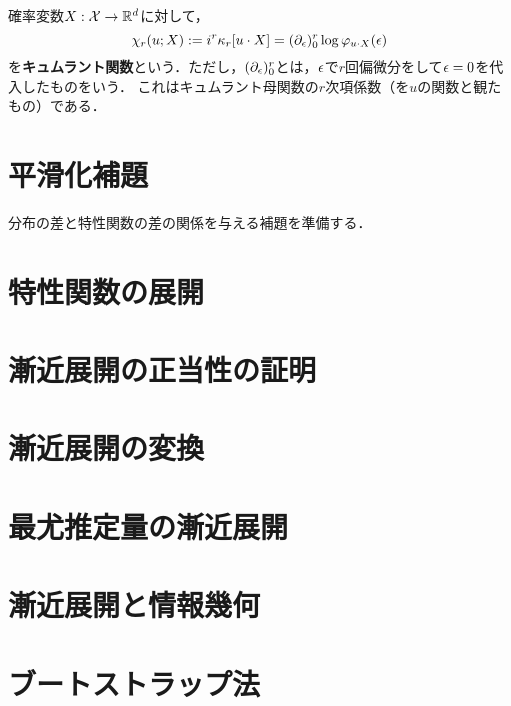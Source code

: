 \documentclass[uplatex,dvipdfmx]{jsreport}
\begin{document}
\begin{definition}
    確率変数$X:\mathcal{X}\to\mathbb{R}^d$に対して，
    \[\chi_r(u;X):=i^r\kappa_r[u\cdot X]=(\partial_\epsilon)^r_0\log\varphi_{u\cdot X}(\epsilon)\]
    を\textbf{キュムラント関数}という．ただし，$(\partial_\epsilon)^r_0$とは，$\epsilon$で$r$回偏微分をして$\epsilon=0$を代入したものをいう．
    これはキュムラント母関数の$r$次項係数（を$u$の関数と観たもの）である．
\end{definition}

\section{平滑化補題}

\begin{tcolorbox}[colframe=ForestGreen, colback=ForestGreen!10!white,breakable,colbacktitle=ForestGreen!40!white,coltitle=black,fonttitle=\bfseries\sffamily,
title=]
    分布の差と特性関数の差の関係を与える補題を準備する．
\end{tcolorbox}

\section{特性関数の展開}

\section{漸近展開の正当性の証明}

\section{漸近展開の変換}

\section{最尤推定量の漸近展開}

\section{漸近展開と情報幾何}

\begin{tcolorbox}[colframe=ForestGreen, colback=ForestGreen!10!white,breakable,colbacktitle=ForestGreen!40!white,coltitle=black,fonttitle=\bfseries\sffamily,
title=]
    
\end{tcolorbox}

\section{ブートストラップ法}
\end{document}
